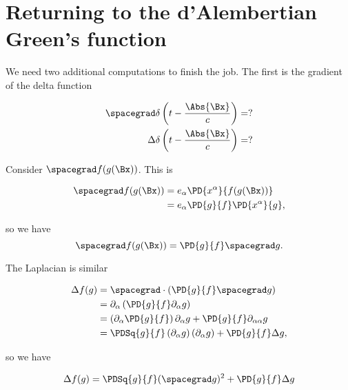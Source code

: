 \section{Returning to the d'Alembertian Green's function}

We need two additional computations to finish the job.  The first is the gradient of the delta function

\begin{equation}\label{eqn:relativisticElectrodynamicsL18:840}
\begin{aligned}
\spacegrad \delta\left(t - \frac{\Abs{\Bx}}{c}\right) &= ? \\
\Delta \delta\left(t - \frac{\Abs{\Bx}}{c}\right) &= ?
\end{aligned}
\end{equation}

Consider $\spacegrad f(g(\Bx))$.  This is

\begin{equation}\label{eqn:relativisticElectrodynamicsL18:860}
\begin{aligned}
\spacegrad f(g(\Bx))
&=
e_\alpha \PD{x^\alpha}{f(g(\Bx))} \\
&=
e_\alpha \PD{g}{f} \PD{x^\alpha}{g},
\end{aligned}
\end{equation}

so we have
\begin{equation}\label{eqn:relativisticElectrodynamicsL18:400}
\spacegrad f(g(\Bx))
=
\PD{g}{f} \spacegrad g.
\end{equation}

The Laplacian is similar

\begin{equation}\label{eqn:relativisticElectrodynamicsL18:880}
\begin{aligned}
\Delta f(g)
&= 
\spacegrad \cdot \left(\PD{g}{f} \spacegrad g \right) \\
&= 
\partial_\alpha \left(\PD{g}{f} \partial_\alpha g \right) \\
&= 
\left( \partial_\alpha \PD{g}{f} \right) \partial_\alpha g 
+\PD{g}{f} \partial_{\alpha\alpha} g  \\
&= 
\PDSq{g}{f} \left( \partial_\alpha g \right) (\partial_\alpha g)
+\PD{g}{f} \Delta g,
\end{aligned}
\end{equation}

so we have

\begin{equation}\label{eqn:relativisticElectrodynamicsL18:420}
\Delta f(g)
= 
\PDSq{g}{f} (\spacegrad g)^2 +\PD{g}{f} \Delta g
\end{equation}

